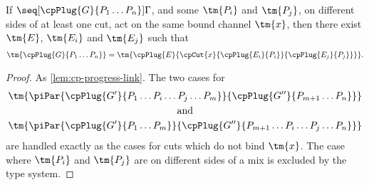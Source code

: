\begin{lemma}\label{lem:hcp-progress-beta}
  If $\seq[{ \cpPlug{G}{P_1 \dots P_n} }]{ \Gamma }$, and some $\tm{P_i}$ and
  $\tm{P_j}$, on different sides of at least one cut, act on the same bound
  channel $\tm{x}$, then there exist $\tm{E}$, $\tm{E_i}$ and $\tm{E_j}$ such
  that 
  \begin{gather*}
    \tm{\cpPlug{G}{P_1 \dots P_n}} =
    \tm{\cpPlug{E}{\cpCut{x}{\cpPlug{E_i}{P_i}}{\cpPlug{E_j}{P_j}}}}.
  \end{gather*}
\end{lemma}
\begin{proof}
  As \cref{lem:cp-progress-link}.
  The two cases for
  \begin{gather*}
    \tm{\piPar{\cpPlug{G'}{P_1 \dots P_i \dots P_j \dots P_m}}{\cpPlug{G''}{P_{m+1} \dots P_n}}}\\
    \text{and}\\
    \tm{\piPar{\cpPlug{G'}{P_1 \dots P_m}}{\cpPlug{G''}{P_{m+1} \dots P_i \dots P_j \dots P_n}}}
  \end{gather*}
  are handled exactly as the cases for cuts which do not bind $\tm{x}$.
  The case where $\tm{P_i}$ and $\tm{P_j}$ are on different sides of a mix is
  excluded by the type system.
\end{proof}
